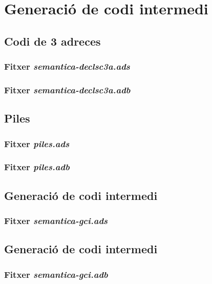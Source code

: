 \section{Generació de codi intermedi}
\subsection{Codi de 3 adreces}
\subsubsection{Fitxer \emph{semantica-declsc3a.ads}}

\newpage

\subsubsection{Fitxer \emph{semantica-declsc3a.adb}}

\newpage

\subsection{Piles}
\subsubsection{Fitxer \emph{piles.ads}}

\newpage

\subsubsection{Fitxer \emph{piles.adb}}

\newpage

\subsection{Generació de codi intermedi}
\subsubsection{Fitxer \emph{semantica-gci.ads}}

\newpage

\subsection{Generació de codi intermedi}
\subsubsection{Fitxer \emph{semantica-gci.adb}}

\newpage

